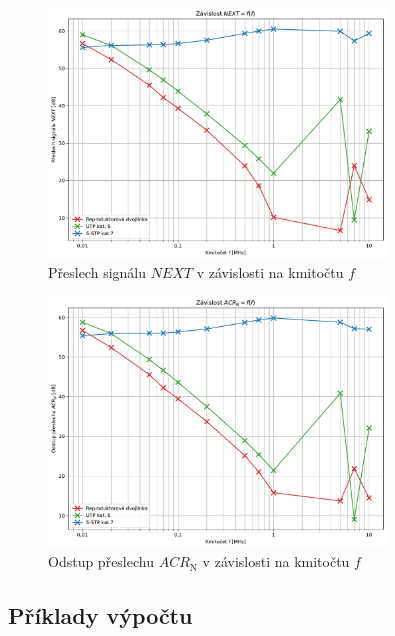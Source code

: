\documentclass[a4paper, czech]{article}
\begin{document}
\begin{figure}[H]
    \centering
    \includegraphics[width=0.8\textwidth]{grafy/graf2.pdf}
    \caption{Přeslech signálu $NEXT$ v závislosti na kmitočtu $f$}
\end{figure}

\begin{figure}[H]
    \centering
    \includegraphics[width=0.8\textwidth]{grafy/graf3.pdf}
    \caption{Odstup přeslechu $ACR_\text{N}$ v závislosti na kmitočtu $f$}
\end{figure}

\subsection{Příklady výpočtu}
\end{document}
